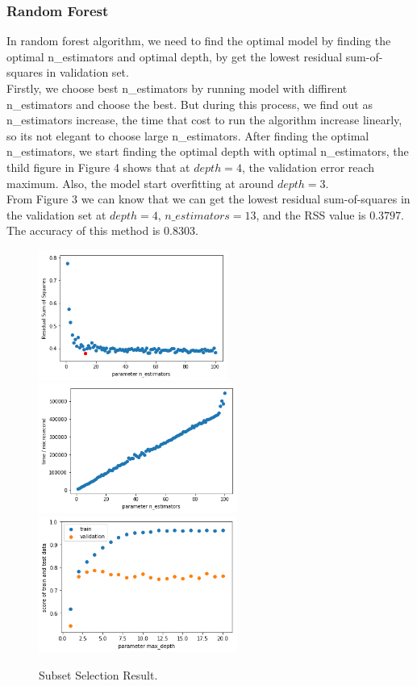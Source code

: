 \documentclass{article}
\begin{document}
\subsubsection{Random Forest}
In random forest algorithm, we need to find the optimal model by finding the optimal n\_estimators and optimal depth, by get the lowest residual sum-of-squares in validation set.\\
Firstly, we choose best n\_estimators by running model with diffirent n\_estimators and choose the best. But during this process, we find out as n\_estimators increase, the time that cost to run the algorithm increase linearly, so its not elegant to choose large n\_estimators. After finding the optimal n\_estimators, we start finding the optimal depth with optimal n\_estimators, the thild figure in Figure 4 shows that at $depth = 4$, the validation error reach maximum. Also, the model start overfitting at around $depth = 3$.\\
From Figure 3 we can know that we can get the lowest residual sum-of-squares in the validation set at $depth = 4$, $n\_estimators = 13$, and the RSS value is $0.3797$. The accuracy of this method is $0.8303$.
\begin{figure}[h]
	\centering
	\includegraphics[width=6.2cm]{random_forest1.jpg}
	\includegraphics[width=6.5cm]{random_forest2.jpg}
	\includegraphics[width=6.5cm]{random_forest3.jpg}
	\caption{Subset Selection Result.}
\end{figure}
\end{document}

